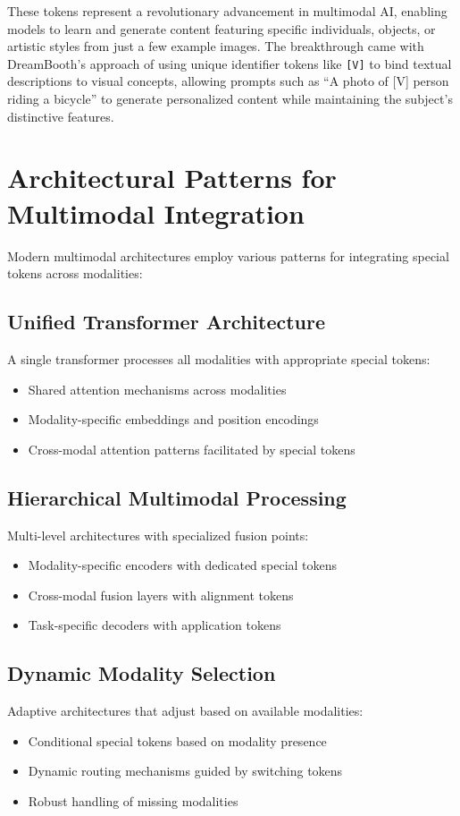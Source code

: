 These tokens represent a revolutionary advancement in multimodal AI, enabling models to learn and generate content featuring specific individuals, objects, or artistic styles from just a few example images. The breakthrough came with DreamBooth's approach of using unique identifier tokens like \texttt{[V]} to bind textual descriptions to visual concepts, allowing prompts such as ``A photo of [V] person riding a bicycle'' to generate personalized content while maintaining the subject's distinctive features.

\section{Architectural Patterns for Multimodal Integration}

Modern multimodal architectures employ various patterns for integrating special tokens across modalities:

\subsection{Unified Transformer Architecture}
A single transformer processes all modalities with appropriate special tokens:
\begin{itemize}
\item Shared attention mechanisms across modalities
\item Modality-specific embeddings and position encodings
\item Cross-modal attention patterns facilitated by special tokens
\end{itemize}

\subsection{Hierarchical Multimodal Processing}
Multi-level architectures with specialized fusion points:
\begin{itemize}
\item Modality-specific encoders with dedicated special tokens
\item Cross-modal fusion layers with alignment tokens
\item Task-specific decoders with application tokens
\end{itemize}

\subsection{Dynamic Modality Selection}
Adaptive architectures that adjust based on available modalities:
\begin{itemize}
\item Conditional special tokens based on modality presence
\item Dynamic routing mechanisms guided by switching tokens
\item Robust handling of missing modalities
\end{itemize}

